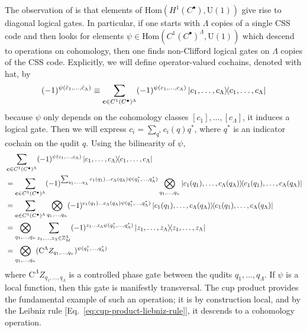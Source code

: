 \documentclass{article}
\theoremstyle{definition}
\theoremstyle{definition}
\newcommand{\Z}{\mathbb Z}
\newcommand{\Hom}{\text{Hom}}
\newcommand{\U}{\mathrm{U}}
\newcommand{\control}[1]{\mathrm{C}^{#1}}
\begin{document}
The observation of \cite{cupsandgates} is that elements of $\Hom(H^1(C^\bullet),
\U(1))$ give rise to diagonal logical gates. In particular, if one starts with
$\Lambda$ copies of a single CSS code and then looks for elements $\psi \in
\Hom(C^1(C^\bullet)^\Lambda, \U(1))$ which descend to operations on cohomology, then one finds non-Clifford logical gates
on $\Lambda$ copies of the CSS code. Explicitly, we will define operator-valued
cochains, denoted with hat, by
\begin{align}
  (-1)^{\psi(\hat c_1, \ldots, \hat c_{\Lambda})} \equiv \sum_{\vb c \in C^1(C^\bullet)^\Lambda} (-1)^{\psi(c_1, \ldots, c_\Lambda)}\ketbra{c_1, \ldots, c_\Lambda}{c_1, \ldots, c_\Lambda}
\end{align}
because $\psi$ only depends on the cohomology classes $[c_1], \ldots,
[c_\Lambda]$, it induces a logical gate.
Then we will express $c_i = \sum_{q^*}c_i(q)q^*$, where $q^*$ is an indicator
cochain on the qudit $q$. Using the bilinearity of $\psi$,
\begin{align}
  &\sum_{\vb c \in C^1(C^\bullet)^\Lambda} (-1)^{\psi(c_1, \ldots, c_\Lambda)}\ketbra{c_1, \ldots, c_\Lambda}{c_1, \ldots, c_\Lambda} \notag\\
&= \sum_{\vb c \in C^1(C^\bullet)^\Lambda} (-1)^{\sum_{q_1, \ldots, q_\Lambda}c_1(q_1)\ldots c_\Lambda(q_\Lambda)\psi(q_1^*, \ldots, q_\Lambda^*)}\bigotimes_{q_1, \ldots, q_n}\ketbra{c_1(q_1), \ldots, c_\Lambda(q_\Lambda)}{c_1(q_1), \ldots, c_\Lambda(q_\Lambda)} \notag\\
            &= \sum_{\vb c \in C^1(C^\bullet)^\Lambda} \bigotimes_{q_1, \ldots, q_n}(-1)^{c_1(q_1)\ldots c_\Lambda(q_\Lambda)\psi(q_1^*, \ldots, q_\Lambda^*)}\ketbra{c_1(q_1), \ldots, c_\Lambda(q_\Lambda)}{c_1(q_1), \ldots, c_\Lambda(q_\Lambda)} \notag\\
            &= \bigotimes_{q_1, \ldots, q_n}\sum_{z_1, \ldots, z_\Lambda \in \Z_M^\Lambda} (-1)^{z_1\ldots z_\Lambda\psi(q_1^*, \ldots, q_\Lambda^*)}\ketbra{z_1, \ldots, z_\Lambda}{z_1, \ldots, z_\Lambda} \notag\\
            &= \bigotimes_{q_1, \ldots, q_n}(\control{\Lambda}Z_{q_1, \ldots, q_n})^{\psi(q_1^*, \ldots, q_\Lambda^*)}
\end{align}
where $\control{\Lambda}Z_{q_1, \ldots, q_\Lambda}$ is a controlled phase gate
between the qudits $q_1,\ldots, q_\Lambda$. If $\psi$ is a local function, then
this gate is manifestly transversal. The cup product provides the fundamental
example of such an operation; it is by construction local, and by the Leibniz
rule [Eq.~\eqref{eq:cup-product-liebniz-rule}], it descends to a cohomology operation.
\end{document}
